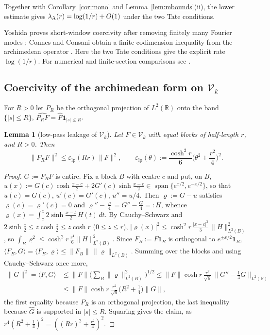\documentclass[10pt]{amsart}
\newtheorem{lemma}[theorem]{Lemma}
\theoremstyle{definition}
\theoremstyle{remark}
\newcommand{\R}{\mathbb R}
\newcommand{\Fh}{\widehat F}
\begin{document}
Together with Corollary~\ref{cor:mono} and Lemma~\ref{lem:mbounds}(ii),
the lower estimate gives $\lambda_{\rm A}(r)=\log(1/r)+O(1)$ under the two Tate conditions.

Yoshida proves short-window coercivity after removing finitely many Fourier
modes \cite[Lemma~3]{Yoshida1992}; Connes and Consani obtain a finite-codimension
inequality from the archimedean operator \cite[Thm.~3.6]{ConnesConsani2021}.
Here the two Tate conditions give the explicit rate $\log(1/r)$.
For numerical and finite-section comparisons see \cite{Kim2026,CvS2025}.


\subsection{Coercivity of the archimedean form on $\mathcal V_k$}\label{subsec:coer-B}
For $R>0$ let $P_R$ be the orthogonal projection of $L^2(\R)$ onto the band $\{|s|\le R\}$,
$\widehat{P_RF}=\Fh\mathbf 1_{|s|\le R}$.

\begin{lemma}[low-pass leakage of $\mathcal V_k$]\label{lem:coer-lowpass}
Let $F\in\mathcal V_k$ with equal blocks of half-length $r$, and $R>0$. Then
\[
\|P_RF\|^2\le\varepsilon_{\mathrm{lp}}(Rr)\,\|F\|^2,\qquad \varepsilon_{\mathrm{lp}}(\theta):=\frac{\cosh^2r}{6}\Big(\theta^2+\frac{r^2}4\Big)^2 .
\]
\end{lemma}
\begin{proof}
$G:=P_RF$ is entire. Fix a block $B$ with centre $c$ and put, on $B$,
$u(x):=G(c)\cosh\frac{x-c}2+2G'(c)\sinh\frac{x-c}2\in\operatorname{span}\{e^{x/2},e^{-x/2}\}$, so that
$u(c)=G(c)$, $u'(c)=G'(c)$, $u''=u/4$. Then $\varrho:=G-u$ satisfies $\varrho(c)=\varrho'(c)=0$ and
$\varrho''-\frac\varrho4=G''-\frac G4=:H$, whence $\varrho(x)=\int_c^x2\sinh\frac{x-t}2\,H(t)\,dt$. By Cauchy--Schwarz and
$2\sinh\frac z2\le z\cosh\frac z2\le z\cosh r$ ($0\le z\le r$),
$|\varrho(x)|^2\le\cosh^2r\,\frac{|x-c|^3}3\,\|H\|_{L^2(B)}^2$, so $\int_B\varrho^2\le\cosh^2r\,\frac{r^4}6\|H\|_{L^2(B)}^2$.
Since $F_B:=F\mathbf 1_B$ is orthogonal to $e^{\pm x/2}\mathbf 1_B$, $\langle F_B,G\rangle=\langle F_B,\varrho\rangle\le\|F_B\|\,\|\varrho\|_{L^2(B)}$.
Summing over the blocks and using Cauchy--Schwarz once more,
\begin{align*}
\|G\|^2=\langle F,G\rangle&\le\|F\|\Big(\sum_B\|\varrho\|_{L^2(B)}^2\Big)^{1/2}\le\|F\|\cosh r\,\frac{r^2}{\sqrt6}\,\|G''-\tfrac14G\|_{L^2(\R)}\\
&\le\|F\|\cosh r\,\frac{r^2}{\sqrt6}\Big(R^2+\frac14\Big)\|G\|,
\end{align*}
the first equality because $P_R$ is an orthogonal projection, the last inequality because
$\widehat G$ is supported in $|s|\le R$. Squaring gives the claim, as $r^4(R^2+\frac14)^2=((Rr)^2+\frac{r^2}4)^2$.
\end{proof}
\end{document}
